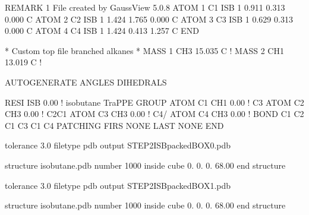 \documentclass[letterpaper,10pt,english]{sphinxmanual}
\begin{document}

\begin{sphinxVerbatim}[commandchars=\\\{\}]
REMARK   1 File  created   by  GaussView   5.0.8
ATOM          1       C1  ISB          1   0.911   \PYGZhy{}0.313    0.000  C
ATOM          2       C2  ISB          1   1.424   \PYGZhy{}1.765    0.000  C
ATOM          3       C3  ISB          1  \PYGZhy{}0.629   \PYGZhy{}0.313    0.000  C
ATOM          4       C4  ISB          1   1.424    0.413   \PYGZhy{}1.257  C
END
\end{sphinxVerbatim}


\begin{sphinxVerbatim}[commandchars=\\\{\}]
* Custom top file \PYGZhy{}\PYGZhy{} branched alkanes
*
MASS     1    CH3      15.035 C !
MASS     2    CH1      13.019 C !

AUTOGENERATE ANGLES DIHEDRALS

RESI   ISB   0.00               !  isobutane \PYGZob{} TraPPE \PYGZcb{}
GROUP
ATOM    C1    CH1       0.00    !  C3\PYGZbs{}
ATOM    C2    CH3       0.00    !     C2\PYGZhy{}C1
ATOM    C3    CH3       0.00    !  C4/
ATOM    C4    CH3       0.00    !
BOND    C1  C2   C1  C3   C1  C4
PATCHING FIRS NONE LAST NONE
END
\end{sphinxVerbatim}


\begin{sphinxVerbatim}[commandchars=\\\{\}]
tolerance   3.0
filetype    pdb
output      STEP2\PYGZus{}ISB\PYGZus{}packed\PYGZus{}BOX\PYGZus{}0.pdb

structure     isobutane.pdb
number        1000
inside cube   0.  0.  0.  68.00
end structure
\end{sphinxVerbatim}


\begin{sphinxVerbatim}[commandchars=\\\{\}]
tolerance   3.0
filetype    pdb
output      STEP2\PYGZus{}ISB\PYGZus{}packed\PYGZus{}BOX\PYGZus{}1.pdb

structure     isobutane.pdb
number        1000
inside cube   0.  0.  0.  68.00
end structure
\end{sphinxVerbatim}
\end{document}
